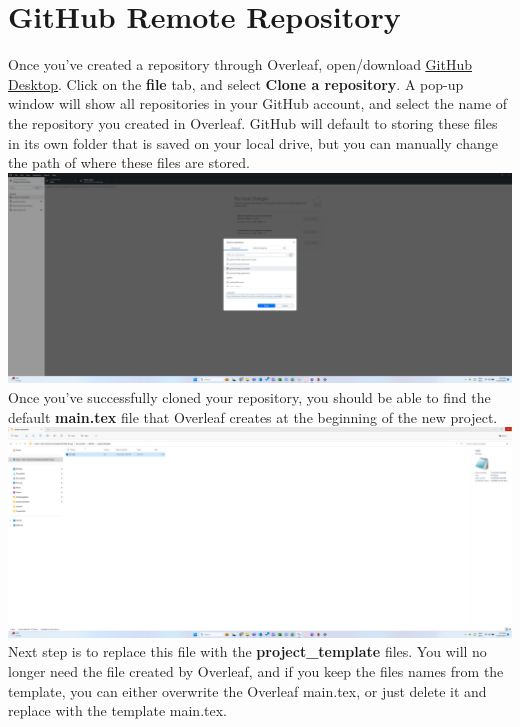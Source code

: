 \documentclass[12pt]{article}
\begin{document}
\section{GitHub Remote Repository}

Once you've created a repository through Overleaf, open/download \href{https://desktop.github.com/}{\underline{GitHub Desktop}}. Click on the \textbf{file} tab, and select \textbf{Clone a repository}. A pop-up window will show all repositories in your GitHub account, and select the name of the repository you created in Overleaf. GitHub will default to storing these files in its own folder that is saved on your local drive, but you can manually change the path of where these files are stored. \\

\includegraphics[width=1\textwidth]{Instructions/project_template_screenshots/project_template_04.png} \\

Once you've successfully cloned your repository, you should be able to find the default \textbf{main.tex} file that Overleaf creates at the beginning of the new project. \\

\includegraphics[width=1\textwidth]{Instructions/project_template_screenshots/project_template_05.png} \\

Next step is to replace this file with the \textbf{project\_template} files. You will no longer need the file created by Overleaf, and if you keep the files names from the template, you can either overwrite the Overleaf main.tex, or just delete it and replace with the template main.tex. \\
\end{document}
